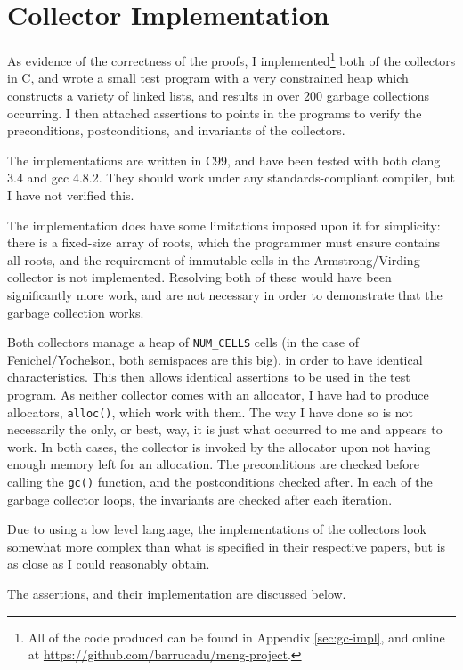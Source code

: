 \section{Collector Implementation}
\label{sec:results-impl}

As evidence of the correctness of the proofs, I
implemented\footnote{All of the code produced can be found in Appendix
  \ref{sec:gc-impl}, and online at
  \url{https://github.com/barrucadu/meng-project}.} both of the
collectors in C, and wrote a small test program with a very
constrained heap which constructs a variety of linked lists, and
results in over 200 garbage collections occurring. I then attached
assertions to points in the programs to verify the preconditions,
postconditions, and invariants of the collectors.

The implementations are written in C99, and have been tested with both
clang 3.4 and gcc 4.8.2. They should work under any
standards-compliant compiler, but I have not verified this.

The implementation does have some limitations imposed upon it for
simplicity: there is a fixed-size array of roots, which the programmer
must ensure contains all roots, and the requirement of immutable cells
in the Armstrong/Virding collector is not implemented. Resolving both
of these would have been significantly more work, and are not
necessary in order to demonstrate that the garbage collection works.

Both collectors manage a heap of \texttt{NUM\_CELLS} cells (in the
case of Fenichel/Yochelson, both semispaces are this big), in order to
have identical characteristics. This then allows identical assertions
to be used in the test program. As neither collector comes with an
allocator, I have had to produce allocators, \texttt{alloc()}, which
work with them. The way I have done so is not necessarily the only, or
best, way, it is just what occurred to me and appears to work. In both
cases, the collector is invoked by the allocator upon not having
enough memory left for an allocation. The preconditions are checked
before calling the \texttt{gc()} function, and the postconditions
checked after. In each of the garbage collector loops, the invariants
are checked after each iteration.

Due to using a low level language, the implementations of the
collectors look somewhat more complex than what is specified in their
respective papers, but is as close as I could reasonably obtain.

The assertions, and their implementation are discussed below.

